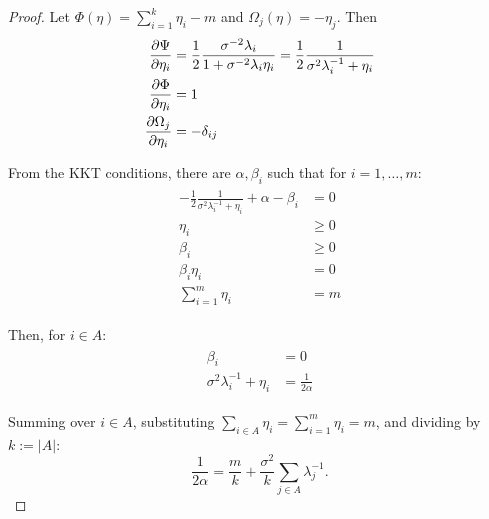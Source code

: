 \begin{proof}
  Let $\Phi(\eta) = \sum_{i=1}^k \eta_i - m$ and $\Omega_j(\eta) =
   -\eta_j$. Then
  \begin{align*}
    \begin{split}
      \frac{\partial \tar}{\partial \eta_i}  &=
       \frac12 \frac{\sigma^{-2}\lambda_i}{1 + \sigma^{-2} \lambda_i\eta_i} = \frac12 \frac{1}{\sigma^{2}\lambda_i^{-1} + \eta_i} \\
      \frac{\partial\Phi}{\partial \eta_i} &= 1 \\
      \frac{\partial \Omega_j}{\partial \eta_i} &= -\delta_{ij}      
    \end{split}
  \end{align*}

  From the KKT conditions, there are $\alpha, \beta_i$ such that for $i=1,\dots,m$:
  \begin{align}
    \begin{split}
      -\frac12 \frac{1}{\sigma^{2}\lambda_i^{-1} + \eta_i} + \alpha - \beta_i  &= 0 \\
      \eta_i &\geq 0\\
      \beta_i &\geq 0\\
      \beta_i \eta_i &= 0\\
      \sum_{i=1}^m \eta_i &= m 
    \end{split}
  \end{align}

  Then, for $i \in A$:
  \begin{align*}
    \begin{split}
      \beta_i &= 0\\
      \sigma^{2}\lambda_i^{-1} + \eta_i  &= \frac{1}{2\alpha}%
    \end{split}
  \end{align*}
  
  Summing over $i \in A$, substituting $\sum_{i\in A} \eta_i =
  \sum_{i=1}^m \eta_i = m$, and dividing by $k:= |A|$:
  $$
  \frac{1}{2\alpha} = \frac{m}{k} + \frac{\sigma^2}{k} \sum_{j\in A} \lambda_j^{-1}.
  $$


\end{proof}

